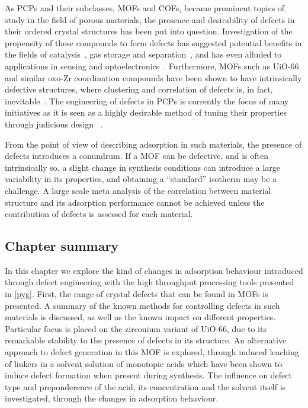 As \glspl{PCP} and their subclasses, \glspl{MOF} and  \glspl{COF},
became prominent topics of study in the field of porous materials,
the presence and desirability of defects in their ordered crystal
structures has been put into question. Investigation of the 
propensity of these compounds to form defects has suggested 
potential benefits in the fields of 
catalysis~\cite{shollDefectsMetalOrganic2015}, gas storage
and separation~\cite{%
    choiRoleStructuralDefects2018,%
    ghoshWaterAdsorptionUiO662014,%
    liSelectiveGasAdsorption2009%
}, and has even alluded to applications in
sensing and optoelectronics~\cite{cliffeMetalOrganicNanosheets2017}.
Furthermore, \glspl{MOF}
such as UiO-66 and similar oxo-Zr coordination compounds have been 
shown to have intrinsically defective structures, where clustering 
and correlation of defects is, in fact, 
inevitable~\cite{cliffeCorrelatedDefectNanoregions2014}.
The engineering of defects in \glspl{PCP} is currently the focus of many
initiatives as it is seen as a highly desirable method of tuning 
their properties through judicious design
~\cite{
    shollDefectsMetalOrganic2015,%
    bennettInterplayDefectsDisorder2016,%
    liangLinkingDefectsHierarchical2018%
}.

From the point of view of describing adsorption in 
such materials, the presence of defects introduces a conundrum.
If a \gls{MOF} can be defective, and is often intrinsically so,
a slight change in synthesis conditions can introduce a 
large variability in its properties, and obtaining a 
``standard'' isotherm may be a challenge. A large scale
meta analysis of the correlation between material structure
and its adsorption performance cannot be achieved unless
the contribution of defects is assessed for each material.

\subsection*{Chapter summary}

In this chapter we explore the kind of changes in 
adsorption behaviour introduced through defect engineering with 
the high throughput processing tools presented in \autoref{pyg}.
First, the range of crystal defects that can be found in \glspl{MOF} 
is presented. A summary of the known methods for controlling defects in
such materials is discussed, as well as the known impact on 
different properties.
Particular focus is placed on the zirconium variant of UiO-66,
due to its remarkable stability to the presence of defects in its
structure.
An alternative approach to defect generation in this \gls{MOF} is explored,
through induced leaching of linkers in a solvent solution of monotopic
acids which have been shown to induce defect formation when present
during synthesis. The influence on defect type and preponderence 
of the acid, its concentration and 
the solvent itself is investigated, through the changes in 
adsorption behaviour.

